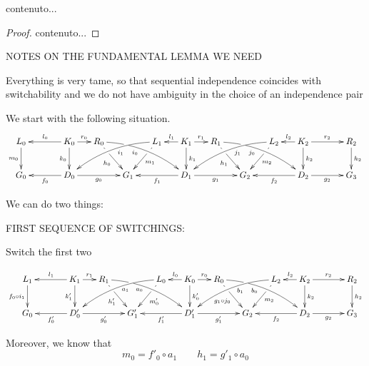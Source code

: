 \documentclass[a4paper,UKenglish,cleveref,pdftex, thm-restate,numberwithinsect]{lipics}
\begin{document}
\begin{corollary}
	contenuto...
\end{corollary}
\begin{proof}
	contenuto...
\end{proof}
\newpage


NOTES ON THE FUNDAMENTAL LEMMA WE NEED

Everything is very tame, so that sequential independence coincides with switchability and we do not have ambiguity in the choice of an independence pair


We start with the following situation.
	\[\xymatrix@C=15pt{L_0\ar[d]_{m_0}&& K_0 \ar[d]_{k_0}\ar[ll]_{l_0} \ar[r]^{r_0} & R_0 \ar@/^.35cm/[drrr]_(.4){i_0}|(.285)\hole \ar[dr]|(.28)\hole_{h_0} && L_1 \ar@/_.35cm/[dlll]^(.4){i_1} \ar[dl]|(.28)\hole^{m_1}& K_1 \ar[d]^{k_1}\ar[l]_{l_1} \ar[r]^{r_1} & R_1 \ar[dr]|(.28)\hole_{h_1} \ar@/^.35cm/[drrr]_(.4){j_0}|(.285)\hole  && L_2 \ar@/_.35cm/[dlll]^(.4){j_1} \ar[dl]|(.28)\hole^{m_2}& K_2 \ar[d]^{k_2}\ar[l]_{l_2} \ar[rr]^{r_2} && R_2 \ar[d]^{h_2} \\G_0 && \ar[ll]^{f_0} D_0 \ar[rr]_{g_0}&& G_1  && \ar[ll]^{f_1} D_1 \ar[rr]_{g_1}&& G_2 && \ar[ll]^{f_2} D_2 \ar[rr]_{g_2}&& G_3 }\]
	
	We can do two things:
	
	FIRST SEQUENCE OF SWITCHINGS:
	
	Switch the first two
	

	\[\xymatrix@C=15pt{L_1\ar[d]_{f_0\circ i_1}&& K_1 \ar[d]_{k'_1}\ar[ll]_{l_1} \ar[r]^{r_1} & R_1 \ar@/^.35cm/[drrr]_(.4){a_0}|(.285)\hole \ar[dr]|(.28)\hole_{h'_1} && L_0 \ar@/_.35cm/[dlll]^(.4){a_1} \ar[dl]|(.28)\hole^{m'_0}& K_0 \ar[d]^{k'_0}\ar[l]_{l_0} \ar[r]^{r_0} & R_0 \ar[dr]|(.28)\hole_{g_1\circ j_0} \ar@/^.35cm/[drrr]_(.4){b_0}|(.285)\hole  && L_2 \ar@/_.35cm/[dlll]^(.4){b_1} \ar[dl]|(.28)\hole^{m_2}& K_2 \ar[d]^{k_2}\ar[l]_{l_2} \ar[rr]^{r_2} && R_2 \ar[d]^{h_2} \\G_0 && \ar[ll]^{f'_0} D'_0 \ar[rr]_{g'_0}&& G'_1  && \ar[ll]^{f'_1} D'_1 \ar[rr]_{g'_1}&& G_2 && \ar[ll]^{f_2} D_2 \ar[rr]_{g_2}&& G_3 }\]
	
	Moreover, we know that
	\[m_0=f'_0\circ a_1 \qquad h_1=g'_1\circ a_0\]
	
\end{document}
